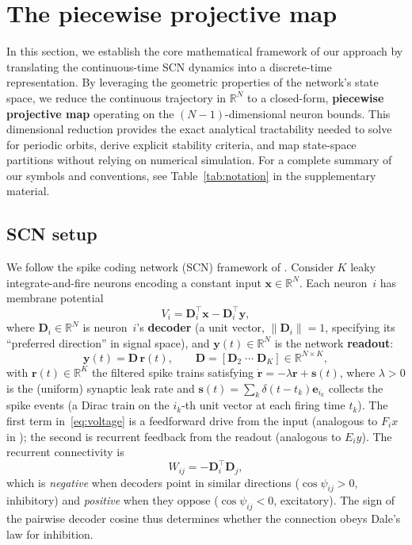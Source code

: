 \documentclass[12pt]{article}
\newcommand{\vv}[1]{\mathbf{#1}}
\newcommand{\DD}{\vv{D}}
\newcommand{\yy}{\vv{y}}
\newcommand{\xx}{\vv{x}}
\newcommand{\RR}{\mathbb{R}}
\begin{document}
\section{The piecewise projective map}\label{sec:map}

In this section, we establish the core mathematical framework of our approach by translating the continuous-time SCN dynamics into a discrete-time representation. By leveraging the geometric properties of the network's state space, we reduce the continuous trajectory in $\RR^N$ to a closed-form, \textbf{piecewise projective map} operating on the $(N-1)$-dimensional neuron bounds. This dimensional reduction provides the exact analytical tractability needed to solve for periodic orbits, derive explicit stability criteria, and map state-space partitions without relying on numerical simulation. For a complete summary of our symbols and conventions, see Table~\ref{tab:notation} in the supplementary material.

\subsection{SCN setup}\label{sec:setup}

We follow the spike coding network (SCN) framework of \citet{boerlin2013predictive,podlaski2024approximating}. Consider $K$ leaky integrate-and-fire neurons encoding a constant input $\xx\in\RR^N$. Each neuron~$i$ has membrane potential
\begin{equation}\label{eq:voltage}
    V_i = \DD_i^\top\xx - \DD_i^\top\yy,
\end{equation}
where $\DD_i\in\RR^N$ is neuron~$i$'s \textbf{decoder} (a unit vector, $\|\DD_i\|=1$, specifying its ``preferred direction'' in signal space), and $\yy(t)\in\RR^N$ is the network \textbf{readout}:
\begin{equation}\label{eq:readout}
    \yy(t) = \vv{D}\,\vv{r}(t),\qquad \vv{D}=[\DD_2\;\cdots\;\DD_K]\in\RR^{N\times K},
\end{equation}
with $\vv{r}(t)\in\RR^K$ the filtered spike trains satisfying $\dot{\vv{r}}=-\lambda\vv{r}+\vv{s}(t)$, where $\lambda>0$ is the (uniform) synaptic leak rate and $\vv{s}(t)=\sum_{k}\delta(t-t_k)\vv{e}_{i_k}$ collects the spike events (a Dirac train on the $i_k$-th unit vector at each firing time $t_k$). The first term in~\eqref{eq:voltage} is a feedforward drive from the input (analogous to $F_i x$ in \citealt{podlaski2024approximating}); the second is recurrent feedback from the readout (analogous to $E_i y$). The recurrent connectivity is
\begin{equation}\label{eq:connectivity}
    W_{ij} = -\DD_i^\top\DD_j,
\end{equation}
which is \emph{negative} when decoders point in similar directions ($\cos\psi_{ij}>0$, inhibitory) and \emph{positive} when they oppose ($\cos\psi_{ij}<0$, excitatory). The sign of the pairwise decoder cosine thus determines whether the connection obeys Dale's law for inhibition.
\end{document}
